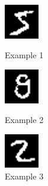 \documentclass[conference]{IEEEtran}
\begin{document}


 \begin{figure}[htbp]
 \begin{minipage}{0.15\textwidth}
\centerline{\includegraphics[width=15mm]{./digit-images/5-0.png}}
\caption{Example 1}
\label{example1}
\end{minipage}
 \begin{minipage}{0.15\textwidth}
\centerline{\includegraphics[width=15mm]{./digit-images/9-9.png}}
\caption{Example 2}
\label{example2}
\end{minipage}
\begin{minipage}{0.15\textwidth}
 \centerline{\includegraphics[width=15mm]{./digit-images/2-4.png}}
\caption{Example 3}
\label{example3}
\end{minipage}
\end{figure}
\end{document}
